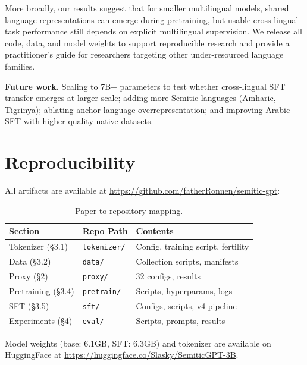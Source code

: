 \documentclass[10pt,twocolumn]{article}
\begin{document}
More broadly, our results suggest that for smaller multilingual models, shared language representations can emerge during pretraining, but usable cross-lingual task performance still depends on explicit multilingual supervision. We release all code, data, and model weights to support reproducible research and provide a practitioner's guide for researchers targeting other under-resourced language families.

\textbf{Future work.} Scaling to 7B+ parameters to test whether cross-lingual SFT transfer emerges at larger scale; adding more Semitic languages (Amharic, Tigrinya); ablating anchor language overrepresentation; and improving Arabic SFT with higher-quality native datasets.

\section{Reproducibility}

All artifacts are available at \url{https://github.com/fatherRonnen/semitic-gpt}:

\begin{table}[H]
\centering\scriptsize
\begin{tabular}{lll}
\toprule
\textbf{Section} & \textbf{Repo Path} & \textbf{Contents} \\
\midrule
Tokenizer (\S3.1) & \texttt{tokenizer/} & Config, training script, fertility \\
Data (\S3.2) & \texttt{data/} & Collection scripts, manifests \\
Proxy (\S2) & \texttt{proxy/} & 32 configs, results \\
Pretraining (\S3.4) & \texttt{pretrain/} & Scripts, hyperparams, logs \\
SFT (\S3.5) & \texttt{sft/} & Configs, scripts, v4 pipeline \\
Experiments (\S4) & \texttt{eval/} & Scripts, prompts, results \\
\bottomrule
\end{tabular}
\caption{Paper-to-repository mapping.}
\label{tab:reproducibility}
\end{table}

Model weights (base: 6.1GB, SFT: 6.3GB) and tokenizer are available on HuggingFace at \url{https://huggingface.co/Slasky/SemiticGPT-3B}.
\end{document}
